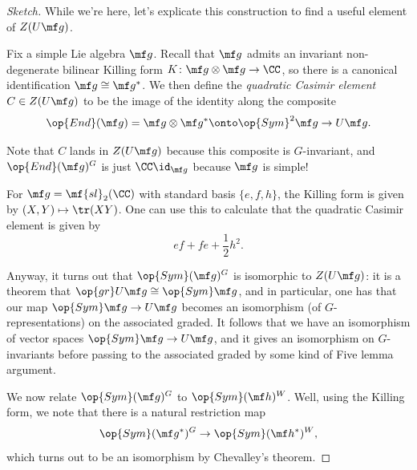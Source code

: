 \documentclass[../notes.tex]{subfiles}
\begin{document}
\begin{proof}[Sketch]
	While we're here, let's explicate this construction to find a useful element of $Z(U\mf g)$.
	\begin{definition}
		Fix a simple Lie algebra $\mf g$. Recall that $\mf g$ admits an invariant non-degenerate bilinear Killing form $K\colon\mf g\otimes\mf g\to\CC$, so there is a canonical identification $\mf g\cong\mf g^*$. We then define the \textit{quadratic Casimir element} $C\in Z(U\mf g)$ to be the image of the identity along the composite
		\[\op{End}(\mf g)=\mf g\otimes\mf g^*\onto\op{Sym}^2\mf g\to U\mf g.\]
	\end{definition}
	\begin{remark}
		Note that $C$ lands in $Z(U\mf g)$ because this composite is $G$-invariant, and $\op{End}(\mf g)^G$ is just $\CC\id_{\mf g}$ because $\mf g$ is simple!
	\end{remark}
	\begin{example}
		For $\mf g=\mf{sl}_2(\CC)$ with standard basis $\{e,f,h\}$, the Killing form is given by $(X,Y)\mapsto\tr(XY)$. One can use this to calculate that the quadratic Casimir element is given by
		\[ef+fe+\frac12h^2.\]
	\end{example}
	Anyway, it turns out that $\op{Sym}(\mf g)^G$ is isomorphic to $Z(U\mf g)$: it is a theorem that $\op{gr}U\mf g\cong\op{Sym}\mf g$, and in particular, one has that our map $\op{Sym}\mf g\to U\mf g$ becomes an isomorphism (of $G$-representations) on the associated graded. It follows that we have an isomorphism of vector spaces $\op{Sym}\mf g\to U\mf g$, and it gives an isomorphism on $G$-invariants before passing to the associated graded by some kind of Five lemma argument.

	We now relate $\op{Sym}(\mf g)^G$ to $\op{Sym}(\mf h)^W$. Well, using the Killing form, we note that there is a natural restriction map
	\[\op{Sym}(\mf g^*)^G\to\op{Sym}(\mf h^*)^W,\]
	which turns out to be an isomorphism by Chevalley's theorem.


\end{proof}
\end{document}
